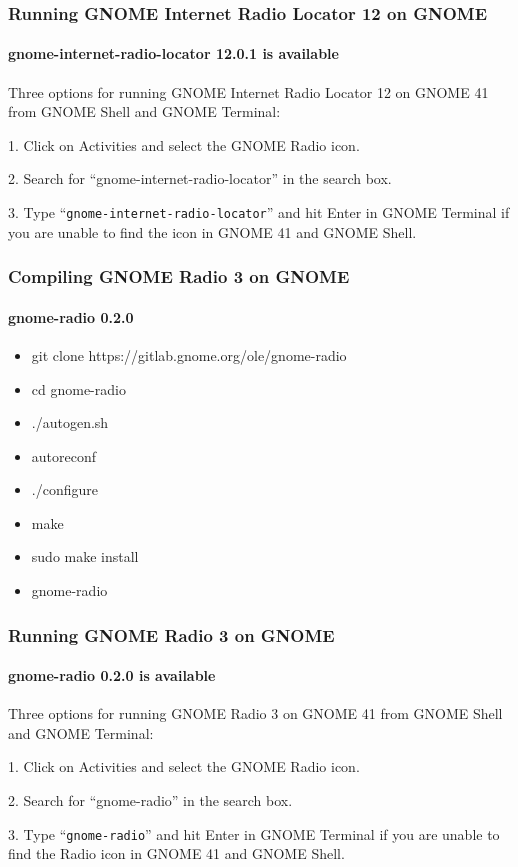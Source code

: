 \documentclass[aspectratio=43]{beamer}
\begin{document}
\begin{frame}
\frametitle{Running GNOME Internet Radio Locator 12 on GNOME}
\framesubtitle{gnome-internet-radio-locator 12.0.1 is available}

Three options for running GNOME Internet Radio Locator 12 on GNOME 41 from GNOME Shell and GNOME Terminal:

1. Click on Activities and select the GNOME Radio icon.

2. Search for ``gnome-internet-radio-locator'' in the search box.

3. Type ``\texttt{gnome-internet-radio-locator}'' and hit Enter in GNOME Terminal if you are unable to find the icon in GNOME 41 and GNOME Shell.

\end{frame}

\begin{frame}
\frametitle{Compiling GNOME Radio 3 on GNOME}
\framesubtitle{gnome-radio 0.2.0}

\begin{itemize}
        \item git clone https://gitlab.gnome.org/ole/gnome-radio
        \item cd gnome-radio
        \item ./autogen.sh
        \item autoreconf
        \item ./configure
        \item make
        \item sudo make install
        \item gnome-radio
\end{itemize}

\end{frame}

\begin{frame}
\frametitle{Running GNOME Radio 3 on GNOME}
\framesubtitle{gnome-radio 0.2.0 is available}

Three options for running GNOME Radio 3 on GNOME 41 from GNOME Shell and GNOME Terminal:

1. Click on Activities and select the GNOME Radio icon.

2. Search for ``gnome-radio'' in the search box.

3. Type ``\texttt{gnome-radio}'' and hit Enter in GNOME Terminal if you are unable to find the Radio icon in GNOME 41 and GNOME Shell.

\end{frame}
\end{document}
